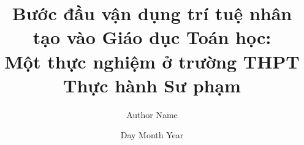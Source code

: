 \usepackage[margin=2cm,left=3cm]{geometry}
\usepackage[utf8]{vntex}
\usepackage{amsfonts,amsmath,amsthm,amssymb} %
\usepackage{enumitem,multicol,multirow,longtable} %
\usepackage{tikz,graphicx,wrapfig,xcolor} %
\usepackage{ragged2e,changepage,fancyhdr} %

\graphicspath{ {images/} }

\renewcommand{\baselinestretch}{1.15}
\setlength\parindent{0pt}
\setlength{\parskip}{6pt}
\everymath{\displaystyle}

\title{
Bước đầu vận dụng trí tuệ nhân tạo vào Giáo dục Toán học:\\
Một thực nghiệm ở trường THPT Thực hành Sư phạm
}
\author{Author Name}
\date{Day Month Year}